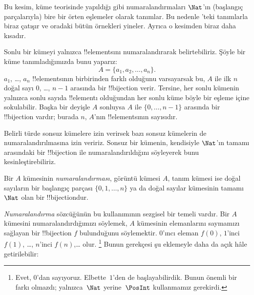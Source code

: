 



\begin{editorial}
  Bu kesim, küme teorisinde yapıldığı gibi numaralandırmaları $\Nat$'ın
  (başlangıç parçalarıyla) bire bir örten eşlemeler olarak tanımlar. Bu
  nedenle 'teki tanımlarla biraz çatışır ve oradaki bütün
  örnekleri yineler. Ayrıca o kesimden biraz daha kısadır.
\end{editorial}

Sonlu bir kümeyi yalnızca !!{element}s{}ını numaralandırarak belirtebiliriz.
Şöyle bir küme tanımladığımızda bunu yaparız:
\[
  A = \{a_1, a_2, \ldots, a_n\}.
\]
$a_1$, \dots, $a_n$ !!{element}s{}ının birbirinden farklı olduğunu
varsayarsak bu, $A$ ile ilk $n$ doğal sayı $0$, \dots, $n-1$ arasında bir
!!{bijection} verir. Tersine, her sonlu kümenin yalnızca sonlu sayıda
!!{element}{}ı olduğundan her sonlu küme böyle bir eşleme içine sokulabilir.
Başka bir deyişle $A$ sonluysa $A$ ile $\{0,\dots,n-1\}$ arasında bir
!!{bijection} vardır; burada $n$, $A$'nın !!{element}s{}ının sayısıdır.

Belirli türde sonsuz kümelere izin verirsek bazı sonsuz kümelerin de
numaralandırılmasına izin veririz. Sonsuz bir kümenin, kendisiyle $\Nat$'ın
tamamı arasındaki bir !!{bijection} ile numaralandırıldığını söyleyerek bunu
kesinleştirebiliriz.

\begin{defn}
Bir $A$ kümesinin \emph{numaralandırması}, görüntü kümesi $A$, tanım kümesi
  ise doğal sayıların bir başlangıç parçası $\{0,1,\ldots,n\}$ ya da doğal
sayılar kümesinin tamamı $\Nat$ olan bir !!{bijection}{}dur.
\end{defn}

\begin{explain}
\emph{Numaralandırma} sözcüğünün bu kullanımının sezgisel bir temeli vardır.
Bir $A$ kümesini numaralandırdığımızı söylemek, $A$ kümesinin elemanlarını
saymamızı sağlayan bir !!{bijection} $f$ bulunduğunu söylemektir. $0$'ıncı
eleman $f(0)$, $1$'inci $f(1)$, \ldots, $n$'inci $f(n)$,\ldots{} olur.
\footnote{Evet, $0$'dan sayıyoruz. Elbette~$1$'den de başlayabilirdik. Bunun
önemli bir farkı olmazdı; yalnızca~$\Nat$ yerine~$\PosInt$ kullanmamız
gerekirdi.} Bunun gerekçesi şu eklemeyle daha da açık hâle getirilebilir:
\end{explain}

